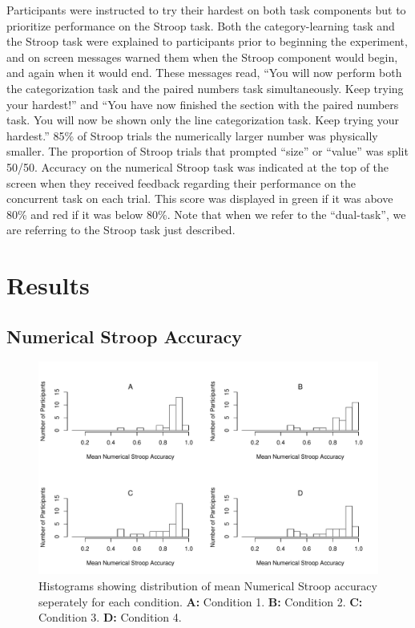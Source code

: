 \documentclass[man,apacite,draftfirst]{apa6}
\begin{document}
Participants were instructed to try their hardest on both task components but to
prioritize performance on the Stroop task. Both the category-learning task and
the Stroop task were explained to participants prior to beginning the
experiment, and on screen messages warned them when the Stroop component would
begin, and again when it would end. These messages read, ``You will now perform
both the categorization task and the paired numbers task simultaneously. Keep
trying your hardest!'' and ``You have now finished the section with the paired
numbers task. You will now be shown only the line categorization task. Keep
trying your hardest.'' 85\% of Stroop trials the numerically larger number was
physically smaller. The proportion of Stroop trials that prompted ``size'' or
``value'' was split 50/50. Accuracy on the numerical Stroop task was indicated
at the top of the screen when they received feedback regarding their performance
on the concurrent task on each trial. This score was displayed in green if it
was above 80\% and red if it was below 80\%. Note that when we refer to the
``dual-task'', we are referring to the Stroop task just described. 

\section*{Results} 
\subsection*{Numerical Stroop Accuracy} 
\begin{figure}[t]
    \centering \includegraphics[width=1.0\textwidth]{../figures/fig_exc_dual.pdf}
    \caption{
      Histograms showing distribution of mean Numerical Stroop accuracy
      seperately for each condition. 
      \textbf{A:} Condition 1.
      \textbf{B:} Condition 2.
      \textbf{C:} Condition 3.
      \textbf{D:} Condition 4.
    }
    \label{fig:exc_dual}
\end{figure}
\end{document}
